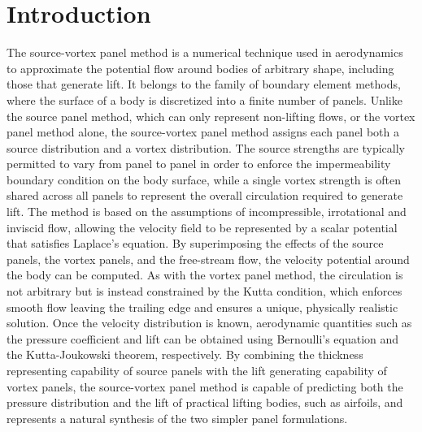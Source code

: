 \section{Introduction}
\label{sec:introduction}

The source-vortex panel method is a numerical technique used in aerodynamics to approximate the potential flow around
bodies of arbitrary shape, including those that generate lift.
It belongs to the family of boundary element methods, where the surface of a body is discretized into a finite number
of panels.
Unlike the source panel method, which can only represent non-lifting flows, or the vortex panel method alone, the
source-vortex panel method assigns each panel both a source distribution and a vortex distribution.
The source strengths are typically permitted to vary from panel to panel in order to enforce the impermeability boundary
condition on the body surface, while a single vortex strength is often shared across all panels to represent the
overall circulation required to generate lift.
The method is based on the assumptions of incompressible, irrotational and inviscid flow, allowing the velocity field
to be represented by a scalar potential that satisfies Laplace's equation.
By superimposing the effects of the source panels, the vortex panels, and the free-stream flow, the velocity
potential around the body can be computed.
As with the vortex panel method, the circulation is not arbitrary but is instead constrained by the Kutta condition,
which enforces smooth flow leaving the trailing edge and ensures a unique, physically realistic solution.
Once the velocity distribution is known, aerodynamic quantities such as the pressure coefficient and lift can be
obtained using Bernoulli's equation and the Kutta-Joukowski theorem, respectively.
By combining the thickness representing capability of source panels with the lift generating capability of vortex
panels, the source-vortex panel method is capable of predicting both the pressure distribution and the lift of
practical lifting bodies, such as airfoils, and represents a natural synthesis of the two simpler panel formulations.
